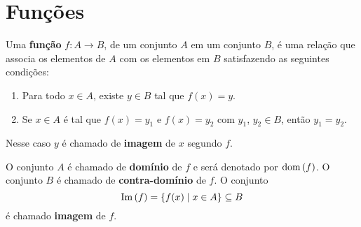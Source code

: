 \chapter{Funções}

\begin{definicao}
Uma \textbf{função} $f : A \to B$, de um conjunto $A$ em um conjunto $B$, é uma relação que associa os elementos de $A$ com os elementos em $B$ satisfazendo as seguintes condições:
    \begin{enumerate}[label={\roman*})]
        \item Para todo $x \in A$, existe $y \in B$ tal que $f(x) = y$.
        \item  Se $x \in A$ é tal que $f(x) = y_1$ e $f(x) = y_2$ com $y_1$, $y_2 \in B$, então $y_1 = y_2$.
    \end{enumerate}
Nesse caso $y$ é chamado de \textbf{imagem} de $x$ segundo $f$.
\end{definicao}

O conjunto $A$ é chamado de \textbf{domínio} de $f$ e será denotado por ${\rm dom\,}(f)$. O conjunto $B$ é chamado de \textbf{contra-domínio} de $f$. O conjunto
\[
    {\rm Im\,}(f) = \{f(x) \mid x \in A\} \subseteq B
\]
é chamado \textbf{imagem} de $f$.

